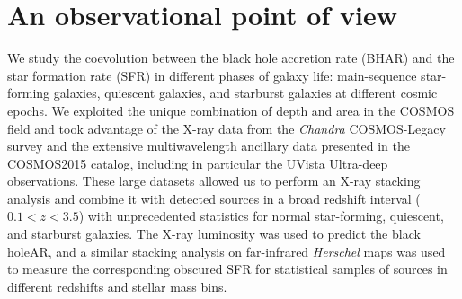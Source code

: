 \chapter{An observational point of view}


We study the coevolution between the black hole accretion rate (BHAR) and the star formation rate (SFR) in different phases of galaxy life: main-sequence star-forming galaxies, quiescent galaxies, and starburst galaxies at different cosmic epochs.
   We exploited the unique combination of depth and area in the COSMOS field and took advantage of the X-ray data from the {\it Chandra} COSMOS-Legacy survey and the extensive multiwavelength ancillary data presented in the COSMOS2015 catalog, including in particular the UVista Ultra-deep observations.
   These large datasets allowed us to perform an X-ray stacking analysis and combine it with detected sources in a broad redshift interval ($0.1<z<3.5$) with unprecedented statistics for normal star-forming, quiescent, and starburst galaxies. 
   The X-ray luminosity was used to predict the black holeAR, and a similar stacking analysis on far-infrared {\it Herschel} maps was used to measure the corresponding obscured SFR for statistical samples of sources in different redshifts and stellar mass bins.
   
